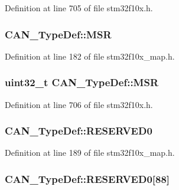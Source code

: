 Definition at line 705 of file stm32f10x.\+h.

\subsubsection[{\texorpdfstring{M\+SR}{MSR}}]{ C\+A\+N\+\_\+\+Type\+Def\+::\+M\+SR}\hypertarget{struct_c_a_n___type_def_a238ceb889aae8c3d641dc2e825705987}{}\label{struct_c_a_n___type_def_a238ceb889aae8c3d641dc2e825705987}


Definition at line 182 of file stm32f10x\+\_\+map.\+h.

\subsubsection[{\texorpdfstring{M\+SR}{MSR}}]{ {\bf uint32\+\_\+t} C\+A\+N\+\_\+\+Type\+Def\+::\+M\+SR}\hypertarget{struct_c_a_n___type_def_af98b957a4e887751fbd407d3e2cf93b5}{}\label{struct_c_a_n___type_def_af98b957a4e887751fbd407d3e2cf93b5}


Definition at line 706 of file stm32f10x.\+h.

\subsubsection[{\texorpdfstring{R\+E\+S\+E\+R\+V\+E\+D0}{RESERVED0}}]{ C\+A\+N\+\_\+\+Type\+Def\+::\+R\+E\+S\+E\+R\+V\+E\+D0}\hypertarget{struct_c_a_n___type_def_a19ce3ccfa72098de17c9691b253db419}{}\label{struct_c_a_n___type_def_a19ce3ccfa72098de17c9691b253db419}


Definition at line 189 of file stm32f10x\+\_\+map.\+h.

\subsubsection[{\texorpdfstring{R\+E\+S\+E\+R\+V\+E\+D0}{RESERVED0}}]{ C\+A\+N\+\_\+\+Type\+Def\+::\+R\+E\+S\+E\+R\+V\+E\+D0\mbox{[}88\mbox{]}}\hypertarget{struct_c_a_n___type_def_ad0cc7fb26376c435bbf148e962739337}{}\label{struct_c_a_n___type_def_ad0cc7fb26376c435bbf148e962739337}


